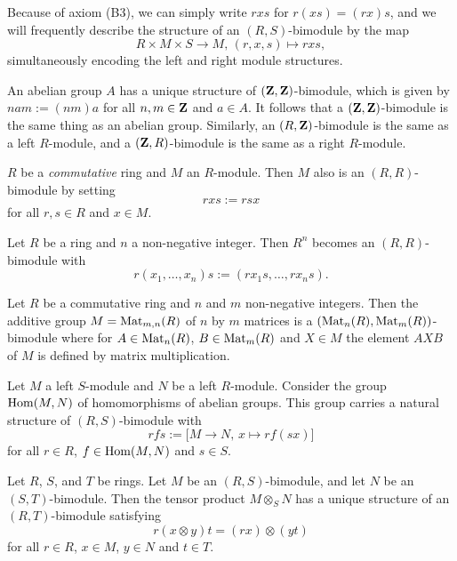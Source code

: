 Because of axiom (B3), we can simply write $rxs$ for $r(xs)=(rx)s$, and we will frequently describe the structure of an $(R,S)$-bimodule by the map
\[
	R\times M \times S \to M,\, (r,x,s) \mapsto rxs,
\]
simultaneously encoding the left and right module structures.

\begin{example}An abelian group $A$ has a unique structure of $({\mathbf{Z}},{\mathbf{Z}})$-bimodule, which is given by 
$nam := (nm)a$ for all $n,m\in {\mathbf{Z}}$ and $a\in A$. It follows that a $({\mathbf{Z}},{\mathbf{Z}})$-bimodule is the same thing as an abelian group. Similarly, an $(R,{\mathbf{Z}})$-bimodule is the same as a left $R$-module, and a $({\mathbf{Z}},R)$-bimodule is the same as a right $R$-module.
\end{example}

\begin{example}$R$ be a \emph{commutative} ring and $M$ an $R$-module. Then $M$ also is an $(R,R)$-bimodule by setting
\[
	rxs := rsx
\]
for all $r,s\in R$ and $x\in M$.
\end{example}

\begin{example}\label{exa:Rn-bimodule}
Let $R$ be a ring and $n$ a non-negative integer. Then $R^n$ becomes an $(R,R)$-bimodule with
\[
	r(x_1,\ldots, x_n)s := (rx_1s, \ldots, rx_ns).
\]
\end{example}

\begin{example}Let $R$ be a commutative ring and $n$ and $m$ non-negative integers. Then the additive group $M=\operatorname{Mat}_{m,n}(R)$ of $n$ by $m$ matrices is a $(\operatorname{Mat}_n(R),\operatorname{Mat}_m(R))$-bimodule where for $A\in \operatorname{Mat}_{n}(R)$, $B\in \operatorname{Mat}_{m}(R)$ and $X\in M$ the element $AXB$ of $M$ is defined by matrix multiplication.
\end{example}


\begin{example}\label{exa:Hom-bimodule}
Let $M$ a left $S$-module and $N$ be a left $R$-module. Consider the group $\operatorname{Hom}(M,N)$ of homomorphisms of abelian groups. This group carries a natural structure of $(R,S)$-bimodule with
\[
	rfs := \big[ M \to N,\, x \mapsto rf(sx) \big]
\] 
for all $r\in R$, $f\in \operatorname{Hom}(M,N)$ and $s\in S$.
\end{example}

\begin{proposition}
Let $R$, $S$, and $T$ be rings. Let $M$ be an $(R,S)$-bimodule, and let $N$ be an $(S,T)$-bimodule. Then the tensor product $M\otimes_S N$ has a unique structure of an $(R,T)$-bimodule satisfying
\[
	r(x\otimes y)t = (rx) \otimes (yt)
\]
for all $r\in R$, $x\in M$, $y\in N$ and  $t\in T$. 
\end{proposition}

